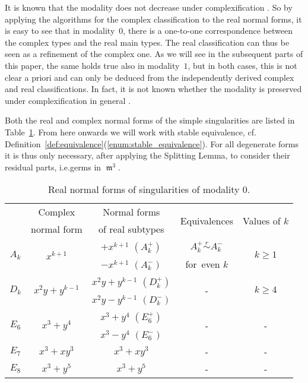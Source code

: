 \documentclass[noend]{amsproc}
\theoremstyle{definition}
\newcommand{\requiv}{\ensuremath{\mathrel{\overset{r}{\sim}}}}
\DeclareMathOperator{\m}{\mathfrak{m}}
\begin{document}
It is known that the modality does not decrease under complexification
\citep[pp.~273-274]{AVG1985}. So by applying the algorithms for the complex
classification to the real normal forms, it is easy to see that in
modality~$0$, there is a one-to-one correspondence between the complex types
and the real main types. The real classification can thus be seen as a
refinement of the complex one. As we will see in the subsequent parts of this
paper, the same holds true also in modality~$1$, but in both cases, this is not
clear a priori and can only be deduced from the independently derived complex
and real classifications. In fact, it is not known whether the modality is
preserved under complexification in general \citep[pp.~273-274]{AVG1985}.

Both the real and complex normal forms of the simple singularities are listed
in Table~\ref{tab:normal_forms}. From here onwards we will work with stable
equivalence, cf.\@
Definition~\ref{def:equivalence}(\ref{enum:stable_equivalence}). For all
degenerate forms it is thus only necessary, after applying the Splitting Lemma,
to consider their residual parts, i.e.\@ germs in $\m^3$.

\begin{table}[!htb]
\centering
\caption{Real normal forms of singularities of modality $0$.}
\label{tab:normal_forms}
\begin{tabular}{|c|c|c|c|c|}
\hline
& Complex & Normal forms & \multirow{2}{*}{Equivalences} &
\multirow{2}{*}{Values of $k$} \\
& normal form & of real subtypes & & \\
\hline\hline
\multirow{2}{*}{$A_k$} & \multirow{2}{*}{$x^{k+1}$} & $+x^{k+1}$ $(A_k^+)$ &
$A_k^+ \requiv A_k^-$ & \multirow{2}{*}{$k \geq 1$} \\ \cline{3-3}
& & $-x^{k+1}$ $(A_k^-)$ & for~even $k$ & \\
\hline
\multirow{2}{*}{$D_k$} & \multirow{2}{*}{$x^2y+y^{k-1}$} &
$x^2y+y^{k-1}$ $(D_k^+)$ & \multirow{2}{*}{-} &
\multirow{2}{*}{$k \geq 4$} \\ \cline{3-3}
& & $x^2y-y^{k-1}$ $(D_k^-)$ & & \\
\hline
\multirow{2}{*}{$E_6$} & \multirow{2}{*}{$x^3+y^4$} & $x^3+y^4$ $(E_6^+)$ &
\multirow{2}{*}{-} & \multirow{2}{*}{-} \\ \cline{3-3}
& & $x^3-y^4$ $(E_6^-)$ & & \\
\hline
$E_7$ & $x^3+xy^3$ & $x^3+xy^3$ & - & - \\
\hline
$E_8$ & $x^3+y^5$ & $x^3+y^5$ & - & - \\
\hline
\end{tabular}
\end{table}
\end{document}
